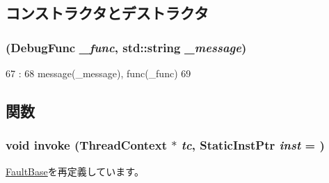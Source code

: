 \subsection{コンストラクタとデストラクタ}
\hypertarget{classGenericISA_1_1M5DebugFault_ac84f0fd05bf094d9083fac60967d074d}{
\subsubsection[{M5DebugFault}]{ ({\bf DebugFunc} {\em \_\-func}, \/  std::string {\em \_\-message})}}
\label{classGenericISA_1_1M5DebugFault_ac84f0fd05bf094d9083fac60967d074d}



\begin{DoxyCode}
67                                                       :
68         message(_message), func(_func)
69     {}

\end{DoxyCode}


\subsection{関数}
\hypertarget{classGenericISA_1_1M5DebugFault_a2bd783b42262278d41157d428e1f8d6f}{
\subsubsection[{invoke}]{\setlength{\rightskip}{0pt plus 5cm}void invoke ({\bf ThreadContext} $\ast$ {\em tc}, \/  {\bf StaticInstPtr} {\em inst} = {})}}
\label{classGenericISA_1_1M5DebugFault_a2bd783b42262278d41157d428e1f8d6f}


\hyperlink{classFaultBase_a2bd783b42262278d41157d428e1f8d6f}{FaultBase}を再定義しています。


